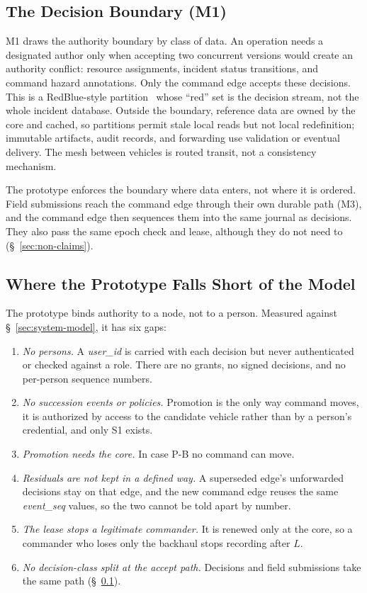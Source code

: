 \subsection{The Decision Boundary (M1)}
\label{sec:state-taxonomy}

M1 draws the authority boundary by class of data. An operation needs a designated author
only when accepting two concurrent versions would create an authority conflict: resource
assignments, incident status transitions, and command hazard annotations. Only the
command edge accepts these decisions. This is a RedBlue-style
partition~\cite{li2012redblue} whose ``red'' set is the decision stream, not the whole
incident database. Outside the boundary, reference data are owned by the core and cached,
so partitions permit stale local reads but not local redefinition; immutable artifacts,
audit records, and forwarding use validation or eventual delivery. The mesh between
vehicles is routed transit, not a consistency mechanism.

The prototype enforces the boundary where data enters, not where it is ordered. Field
submissions reach the command edge through their own durable path (M3), and the command
edge then sequences them into the same journal as decisions. They also pass the same
epoch check and lease, although they do not need to (\S~\ref{sec:non-claims}).

\subsection{Where the Prototype Falls Short of the Model}
\label{sec:model-gap}

The prototype binds authority to a node, not to a person. Measured against
\S~\ref{sec:system-model}, it has six gaps:
\begin{enumerate}
  \item \emph{No persons.} A \textit{user\_id} is carried with each decision but never
  authenticated or checked against a role. There are no grants, no signed decisions, and
  no per-person sequence numbers.
  \item \emph{No succession events or policies.} Promotion is the only way command moves,
  it is authorized by access to the candidate vehicle rather than by a person's
  credential, and only S1 exists.
  \item \emph{Promotion needs the core.} In case P-B no command can move.
  \item \emph{Residuals are not kept in a defined way.} A superseded edge's unforwarded
  decisions stay on that edge, and the new command edge reuses the same
  \textit{event\_seq} values, so the two cannot be told apart by number.
  \item \emph{The lease stops a legitimate commander.} It is renewed only at the core,
  so a commander who loses only the backhaul stops recording after $L$.
  \item \emph{No decision-class split at the accept path.} Decisions and field
  submissions take the same path (\S~\ref{sec:state-taxonomy}).
\end{enumerate}

